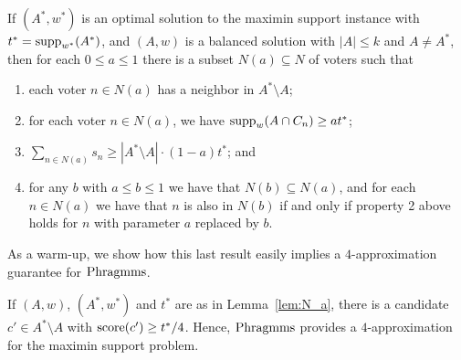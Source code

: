 \begin{lemma}\label{lem:N_a}
If $(A^*, w^*)$ is an optimal solution to the maximin support instance with $t^*=\operatorname{supp}_{w^*}(A^*)$, and $(A,w)$ is a balanced solution with $|A|\leq k$ and $A\neq A^*$, then for each $0\leq a\leq 1$ there is a subset $N(a)\subseteq N$ of voters such that 
\begin{enumerate}
	\item each voter $n\in N(a)$ has a neighbor in $A^*\setminus A$;
	\item for each voter $n\in N(a)$, we have $\operatorname{supp}_w(A\cap C_n)\geq at^*$;
	\item $\sum_{n\in N(a)} s_n \geq |A^* \setminus A|\cdot (1-a) t^*$; and
	\item for any $b$ with $a\leq b\leq 1$ we have that $N(b)\subseteq N(a)$, and for each $n\in N(a)$ we have that $n$ is also in $N(b)$ if and only if property 2 above holds for $n$ with parameter $a$ replaced by $b$.
\end{enumerate}
\end{lemma}

As a warm-up, we show how this last result easily implies a $4$-approximation guarantee for $\operatorname{Phragmms}$.

\begin{lemma}
If $(A,w)$, $(A^*,w^*)$ and $t^*$ are as in Lemma~\ref{lem:N_a}, there is a candidate $c'\in A^*\setminus A$ with $\operatorname{score}(c')\geq t^*/4$. Hence, $\operatorname{Phragmms}$ provides a $4$-approximation for the maximin support problem.
\end{lemma}

